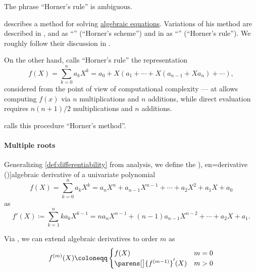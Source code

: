 \begin{remark}\label{rem:alg:horners_rule}
  The phrase \enquote{Horner's rule} is ambiguous.

  \textcite{Horner1819SolvingNumericalEquations} describes a method for solving \hyperref[def:polynomial_equation]{algebraic equations}. Variations of his method are described in \cite[144]{Курош1968КурсВысшейАлгебры}, \cite[97]{Винберг2014КурсАлгебры} and \cite[208]{Кострикин2020АлгебраЧасть1} as \enquote{} (\enquote{Horner's scheme}) and in \cite[\S III.V.2]{Обрешков1962ВисшаАлгебра} as \enquote{} (\enquote{Horner's rule}). We roughly follow their discussion in .

  On the other hand, \textcite[486]{Knuth1997ArtVol2} calls \enquote{Horner's rule} the representation
  \begin{equation}\label{eq:rem:alg:horners_rule/knuth}
    f(X) = \sum_{k=0}^n a_k X^k = a_0 + X (a_1 + \cdots + X(a_{n-1} + X a_n) + \cdots),
  \end{equation}
  considered from the point of view of computational complexity --- at allows computing \( f(x) \) via \( n \) multiplications and \( n \) additions, while direct evaluation requires  \( {n(n+1)} / 2 \) multiplications and \( n \) additions.

  \textcite[exerc. 3.3.14]{Rosen2019DiscreteMathematics} calls this procedure \enquote{Horner's method}.
\end{remark}

\paragraph{Multiple roots}

\begin{definition}\label{def:algebraic_derivative}
  Generalizing \cref{def:differentiability} from analysis, we define the \term[ru=производная (\cite[163]{Тыртышников2017ОсновыАлгебры}), en=derivative (\cite[434]{Aluffi2009Algebra})]{algebraic derivative} of a univariate polynomial
  \begin{equation*}
    f(X) = \sum_{k=0}^n a_k X^k = a_n X^n + a_{n-1} X^{n-1} + \cdots + a_2 X^2 + a_1 X + a_0
  \end{equation*}
  as
  \begin{equation*}
    f'(X) \coloneqq \sum_{k=1}^n k a_k X^{k-1} = n a_n X^{n-1} + (n-1) a_{n-1} X^{n-2} + \cdots + a_2 X + a_1.
  \end{equation*}

  Via , we can extend algebraic derivatives to order \( m \) as
  \begin{equation*}
    f^{(m)}(X) \coloneqq \begin{cases}
      f(X)                             &m = 0 \\
      \parens[\big]{ f^{(m - 1)} }'(X) &m > 0
    \end{cases}
  \end{equation*}
\end{definition}

